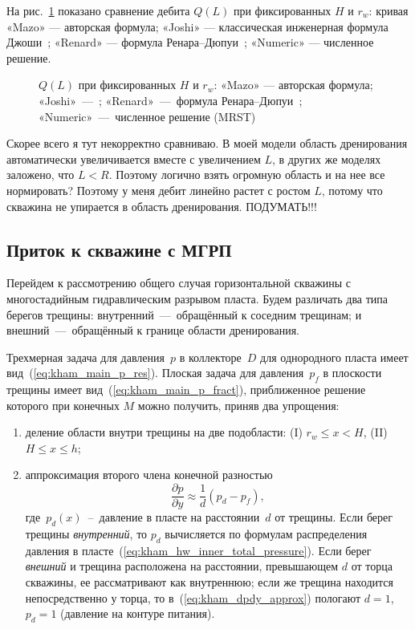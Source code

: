 \documentclass{article}
\begin{document}
На рис.~\ref{fig:kham_compare_hw_mrst} показано сравнение дебита $Q(L)$ при фиксированных $H$ и $r_w$:
кривая «Mazo» — авторская формула; «Joshi» — классическая инженерная формула Джоши~\cite{lit:kham_joshi1988};
«Renard» — формула Ренара–Дюпуи~\cite{lit:kham_renard_dupuy1991}; «Numeric» — численное решение.
\begin{figure}[H]
	\centering
	
	\caption{$Q(L)$ при фиксированных $H$ и $r_w$: «Mazo» — авторская формула; «Joshi»~---~\cite{lit:kham_joshi1988};
		«Renard»~---~формула Ренара–Дюпуи~\cite{lit:kham_renard_dupuy1991}; «Numeric»~---~численное решение (MRST)}
	\label{fig:kham_compare_hw_mrst}
\end{figure}

\begin{tcolorbox}[colback=red!20, colframe=black, coltitle=black, colbacktitle=red, title=\textbf{Ошибка}]
	Скорее всего я тут некорректно сравниваю. В моей модели область дренирования автоматически увеличивается вместе с увеличением
	$L$, в других же моделях заложено, что $L < R$. Поэтому логично взять огромную область и на нее все нормировать?
	Поэтому у меня дебит линейно растет с ростом $L$, потому что скважина не упирается в область дренирования. ПОДУМАТЬ!!!
\end{tcolorbox}


\subsection{Приток к скважине с МГРП}
Перейдем к рассмотрению общего случая горизонтальной скважины с многостадийным гидравлическим разрывом пласта.
Будем различать два типа берегов трещины: внутренний~---~обращённый к соседним трещинам;
и внешний~---~обращённый к границе области дренирования.

Трехмерная задача для давления~$p$ в коллекторе~$D$ для однородного пласта имеет вид~(\ref{eq:kham_main_p_res}).
Плоская задача для давления~$p_f$ в плоскости трещины имеет вид~(\ref{eq:kham_main_p_fract}),
приближенное решение которого при конечных $M$ можно получить, приняв два упрощения:
\begin{enumerate}
	\item деление области внутри трещины на две подобласти: (I) $r_w \leq x < H$, (II) $H \leq x \leq h$;
	\item  аппроксимация второго члена конечной разностью
	      \begin{equation}
		      \displaystyle
		      \dfrac{\partial p}{\partial y} \approx \dfrac{1}{d}\left(p_d - p_f\right),
		      \label{eq:kham_dpdy_approx}
	      \end{equation}
	      где~$p_d(x)$~--~давление в пласте на расстоянии~$d$ от трещины.
	      Если берег трещины \emph{внутренний}, то $p_d$ вычисляется по формулам
	      распределения давления в  пласте~(\ref{eq:kham_hw_inner_total_pressure}). Если берег \emph{внешний} и трещина
	      расположена на расстоянии, превышающем $d$ от торца скважины, ее рассматривают как внутреннюю;
	      если же трещина находится непосредственно у торца, то в~(\ref{eq:kham_dpdy_approx})
	      пологают $d = 1$, $p_d = 1$ (давление на контуре питания).
\end{enumerate}
\end{document}
